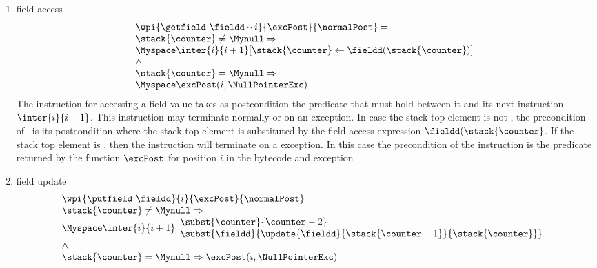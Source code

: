 \begin{itemize}
\begin{enumerate}
			\item field access  \\
				 $$ 	\begin{array}{l} \wpi{\getfield  \ \fieldd } {i} {\excPost}{\normalPost}  =  \\
				 		\stack{\counter } \ne \Mynull \Rightarrow \\
						      \Myspace	\inter{i}{i+1}[ \stack{\counter } \leftarrow \fieldd ( \stack{\counter } ) ] \\
									 \wedge \\
						\stack{\counter } = \Mynull \Rightarrow \\
								\Myspace     \excPost( i, \NullPointerExc) 
					\end{array} 
					$$
			  The instruction for accessing a field value takes as postcondition the predicate that must hold between it and its next instruction
			  $\inter{i}{i+1}$.  This instruction may terminate normally or on an exception.
			  In case the stack top element is not \Mynull, the precondition of \getfield \ is its postcondition where the stack 
			  top element is substituted by the field access expression $\fieldd ( \stack{\counter }$.
			  If the stack top element is \Mynull, then the instruction will terminate on  a \NullPointerExc exception. In this case the precondition
			  of the instruction is the predicate returned by the function $\excPost$ for position $i$ in the bytecode and exception \NullPointerExc
			  
			\item  field update \\
			$$\begin{array}{l}
                                  \wpi{\putfield  \ \fieldd } {i}{\excPost}{\normalPost}  =  \\
				 		\stack{\counter } \ne \Mynull \Rightarrow \\
						 \Myspace \inter{i}{i+1}
                                                     \begin{array}{l}
                                                              \subst{ \counter }{  \counter -2 } \\
							     \subst{  \fieldd}{ \update{\fieldd}{ \stack{\counter - 1}}{  \stack{\counter} } }
						       \end{array} 
						        \\
							\wedge \\
							\stack{\counter } = \Mynull \Rightarrow   \excPost( i, \NullPointerExc ) \\
					  \end{array} 
					$$
			                

\end{enumerate}
\end{itemize}
